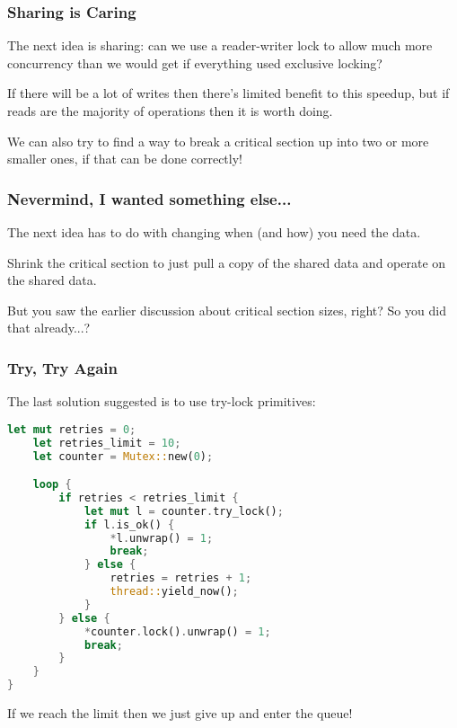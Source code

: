 \begin{frame}
\frametitle{Sharing is Caring}

The next idea is sharing: can we use a reader-writer lock to allow much more concurrency than we would get if everything used exclusive locking? 

If there will be a lot of writes then there's limited benefit to this speedup, but if reads are the majority of operations then it is worth doing. 

We can also try to find a way to break a critical section up into two or more smaller ones, if that can be done correctly!

\end{frame}

\begin{frame}
\frametitle{Nevermind, I wanted something else...}

The next idea has to do with changing when (and how) you need the data. 

Shrink the critical section to just pull a copy of the shared data and operate on the shared data. 
 
 
But you saw the earlier discussion about critical section sizes, right? So you did that already...?


\end{frame} 


\begin{frame}[fragile]
\frametitle{Try, Try Again}

The last solution suggested is to use try-lock primitives:

\begin{lstlisting}[language=Rust]
    let mut retries = 0;
    let retries_limit = 10;
    let counter = Mutex::new(0);

    loop {
        if retries < retries_limit {
            let mut l = counter.try_lock();
            if l.is_ok() {
                *l.unwrap() = 1;
                break;
            } else {
                retries = retries + 1;
                thread::yield_now();
            }
        } else {
            *counter.lock().unwrap() = 1;
            break;
        }
    }
}
\end{lstlisting}


If we reach the limit then we just give up and enter the queue!

\end{frame}



